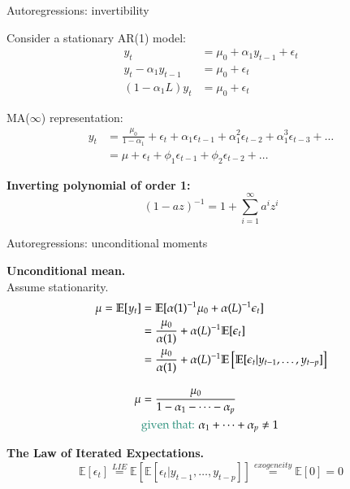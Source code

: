 \documentclass[notes,blackandwhite,mathsans]{beamer}
\begin{document}
\begin{frame}{Autoregressions: invertibility}

{\color{mcxs2}Consider a stationary} AR(1) {\color{mcxs2}model:}
\begin{align*}
y_t &= \mu_0 +\alpha_1 y_{t-1} + \epsilon_t \\
y_t -\alpha_1 y_{t-1} &= \mu_0 + \epsilon_t \\
(1-\alpha_1L)y_t &= \mu_0 + \epsilon_t 
\end{align*}


 MA($\infty$) {\color{mcxs2}representation:}
\begin{align*} 
y_t &= \frac{\mu_0}{1-\alpha_1} + \epsilon_t + \alpha_1 \epsilon_{t-1} + \alpha_1^2 \epsilon_{t-2} + \alpha_1^3 \epsilon_{t-3} + \dots\\
 &= \mu + \epsilon_t + \phi_1 \epsilon_{t-1} + \phi_2\epsilon_{t-2} + \dots
\end{align*}

\bigskip\textbf{Inverting polynomial of order 1:}
$$ (1 - az )^{-1} = 1 + \sum_{i=1}^{\infty} a^i z^i $$
\end{frame}






\begin{frame}{Autoregressions: unconditional moments }


\textbf{Unconditional mean.}\\
{\color{mcxs2}Assume stationarity.}
\begin{align*}
\mu = \mathbb{E}[y_t] &= \mathbb{E}[\alpha(1)^{-1}\mu_0 + \alpha(L)^{-1}\epsilon_t ] \\
&= \frac{\mu_0}{\alpha(1)} + \alpha(L)^{-1}\mathbb{E}[\epsilon_t] \\
&= \frac{\mu_0}{\alpha(1)} + \alpha(L)^{-1}\mathbb{E}\left[\mathbb{E}[\epsilon_t|y_{t-1},\dots,y_{t-p}]\right] \\[2ex]
\mu &= \frac{\mu_0}{1 - \alpha_1 - \dots - \alpha_p } \\
&\text{\color{mcxs2}given that: }\alpha_1 + \dots + \alpha_p \neq 1
\end{align*}

\textbf{The Law of Iterated Expectations.}\\
$$ \mathbb{E}\left[\epsilon_t\right] \overset{LIE}{=} \mathbb{E}\left[\mathbb{E}[\epsilon_t|y_{t-1},\dots,y_{t-p}]\right] \overset{exogeneity}{=} \mathbb{E}\left[0\right] = 0$$
\end{frame}
\end{document}
